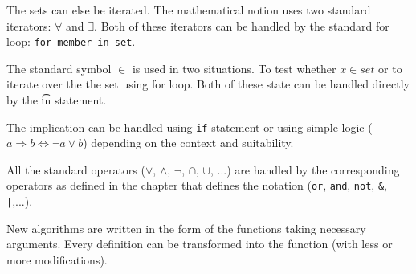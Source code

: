 \documentclass[11pt,oneside]{fithesis2}
\newcommand{\T}[1]{\texttt{#1}}
\begin{document}
The sets can else be iterated. The mathematical notion uses two standard iterators: $\forall$ and $\exists$. Both of these iterators can be handled by the standard for loop: \T{for member in set}.

The standard symbol $\in$ is used in two situations. To test whether $x \in set$ or to iterate over the the set using for loop. Both of these state can be handled directly by the \t{in} statement.

The implication can be handled using \T{if} statement or using simple logic ($a \Rightarrow b \Leftrightarrow \neg a \vee b$) depending on the context and suitability.

All the standard operators ($\vee$, $\wedge$, $\neg$, $\cap$, $\cup$, ...) are handled by the corresponding operators as defined in the chapter that defines the notation (\T{or}, \T{and}, \T{not}, \T{\&}, \T{|},...).

New algorithms are written in the form of the functions taking necessary arguments. Every definition can be transformed into the function (with less or more modifications).
\end{document}

